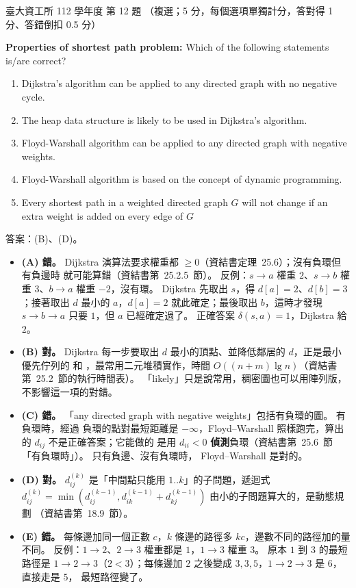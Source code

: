 \begin{pastexam}[label={px:ntu-112-dsa-12}]{臺大資工所 112 學年度 第 12 題}
（複選；5 分，每個選項單獨計分，答對得 1 分、答錯倒扣 0.5 分）

\textbf{Properties of shortest path problem:} Which of the following statements is/are correct?
\begin{enumerate}[label=(\Alph*)]
\item Dijkstra's algorithm can be applied to any directed graph with no negative cycle.
\item The heap data structure is likely to be used in Dijkstra's algorithm.
\item Floyd-Warshall algorithm can be applied to any directed graph with negative weights.
\item Floyd-Warshall algorithm is based on the concept of dynamic programming.
\item Every shortest path in a weighted directed graph $G$ will not change if an extra weight is
added on every edge of $G$
\end{enumerate}
\end{pastexam}

\begin{pastsoln}
答案：(B)、(D)。

\begin{itemize}
\item \textbf{(A) 錯。} Dijkstra 演算法要求權重都 $\ge 0$（資結書定理~25.6）；沒有負環但有負邊時
就可能算錯（資結書第~25.2.5~節）。 反例：$s \to a$ 權重 $2$、$s \to b$ 權重 $3$、$b \to a$ 權重
$-2$，沒有環。 Dijkstra 先取出 $s$，得 $d[a] = 2$、$d[b] = 3$；接著取出 $d$ 最小的 $a$，$d[a] = 2$
就此確定；最後取出 $b$，這時才發現 $s \to b \to a$ 只要 $1$，但 $a$ 已經確定過了。 正確答案
$\delta(s, a) = 1$，Dijkstra 給 $2$。
\item \textbf{(B) 對。} Dijkstra 每一步要取出 $d$ 最小的頂點、並降低鄰居的 $d$，正是最小優先佇列的
 和 ，最常用二元堆積實作，時間 $O((n + m) \lg n)$（資結書
第~25.2~節的執行時間表）。 「likely」只是說常用，稠密圖也可以用陣列版，不影響這一項的對錯。
\item \textbf{(C) 錯。} 「any directed graph with negative weights」包括有負環的圖。 有負環時，經過
負環的點對最短距離是 $-\infty$，Floyd--Warshall 照樣跑完，算出的 $d_{ij}$ 不是正確答案；它能做的
是用 $d_{ii} < 0$ \textbf{偵測}負環（資結書第~25.6~節「有負環時」）。 只有負邊、沒有負環時，
Floyd--Warshall 是對的。
\item \textbf{(D) 對。} $d_{ij}^{(k)}$ 是「中間點只能用 $1..k$」的子問題，遞迴式
$d_{ij}^{(k)} = \min(d_{ij}^{(k-1)}, d_{ik}^{(k-1)} + d_{kj}^{(k-1)})$ 由小的子問題算大的，是動態規劃
（資結書第~18.9~節）。
\item \textbf{(E) 錯。} 每條邊加同一個正數 $c$，$k$ 條邊的路徑多 $kc$，邊數不同的路徑加的量不同。
反例：$1 \to 2$、$2 \to 3$ 權重都是 $1$，$1 \to 3$ 權重 $3$。 原本 $1$ 到 $3$ 的最短路徑是
$1 \to 2 \to 3$（$2 < 3$）；每條邊加 $2$ 之後變成 $3, 3, 5$，$1 \to 2 \to 3$ 是 $6$，直接走是 $5$，
最短路徑變了。
\end{itemize}
\end{pastsoln}
